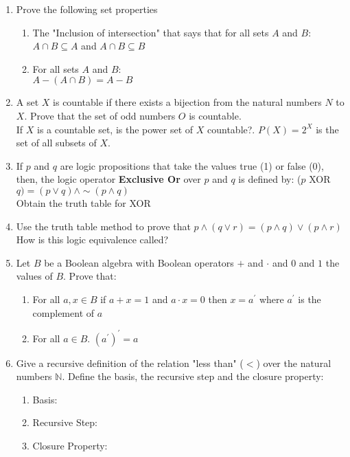 
\begin{enumerate}
    \item Prove the following set properties
    \begin{enumerate}
        \item The "Inclusion of intersection" that says that for all sets $A$ and $B$: \\
    $A \cap B \subseteq A$ and $A \cap B \subseteq B$
    
    \item For all sets $A$ and $B$:\\
    $A-(A \cap B) =A-B$
    \end{enumerate}
    
    \item A set $X$ is countable if there exists a bijection from the natural numbers $N$ to $X$. Prove that the set of odd numbers $O$ is countable. \\
    If $X$ is a countable set, is the power set of $X$  countable?.  $P(X)= 2^{X}$ is the set of all subsets of $X$.
    
    \item If $p$ and $q$ are logic propositions that take the values true (1) or false (0), then, the logic operator \textbf{Exclusive Or} over $p$ and $q$ is defined by:  ($p$\; XOR\;  $q) = (p \lor q) \land  \sim (p \land q)$\\
    Obtain the truth table for XOR
    
    \item Use the truth table method to prove that $p \land (q \lor r) = (p \land q) \lor (p \land r)$ \\
    How is this logic equivalence called?
    
    \item Let $B$ be a Boolean algebra with Boolean operators $+$ and $\cdot$ and $0$ and $1$ the values of $B$. Prove that:
    \begin{enumerate}
        \item For all $a,x \in B$ if $a+x=1$ and $a \cdot x=0$ then $x=a^{'}$ where $a^{'}$ is the complement of $a$
        \item For all $a \in B$. $(a^{'})^{'}=a$
    \end{enumerate}
    
    \item Give a recursive definition of the relation "less than" ($<$) over the natural numbers $\mathbb {N}$. Define the basis, the recursive step and the closure property:
    \begin{enumerate}
        \item Basis: \\
        \item Recursive Step: \\
        \item Closure Property:\\
    \end{enumerate}
    

\end{enumerate}
